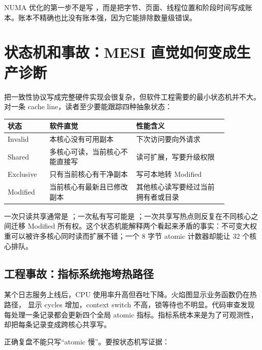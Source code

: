 \begin{keyidea}
NUMA 优化的第一步不是写 ，而是把字节、页面、线程位置和阶段时间写成账本。账本不精确也比没有账本强，因为它能排除数量级错误。
\end{keyidea}

\section{状态机和事故：MESI 直觉如何变成生产诊断}

把一致性协议写成完整硬件实现会很复杂，但软件工程需要的最小状态机并不大。对一条 cache line，读者至少要能跟踪四种抽象状态：

\begin{center}
\begin{tabular}{p{0.16\linewidth}p{0.34\linewidth}p{0.36\linewidth}}
\toprule
状态 & 软件直觉 & 性能含义 \\
\midrule
Invalid & 本核心没有可用副本 & 下次访问要向外请求 \\
Shared & 多核心可读，当前核心不能直接写 & 读可扩展，写要升级权限 \\
Exclusive & 只有当前核心有干净副本 & 写可本地转 Modified \\
Modified & 当前核心有最新且已修改副本 & 其他核心读写要经过当前拥有者或目录 \\
\bottomrule
\end{tabular}
\end{center}

一次只读共享通常是 ；一次私有写可能是 ；一次共享写热点则反复在不同核心之间迁移 Modified 所有权。这个状态机能解释两个看起来矛盾的事实：不可变大权重可以被许多核心同时读而扩展不错；一个 8 字节 atomic 计数器却能让 32 个核心排队。

\subsection{工程事故：指标系统拖垮热路径}

某个日志服务上线后，CPU 使用率升高但吞吐下降。火焰图显示业务函数仍在热路径， 显示 cycles 增加，context switch 不高，锁等待也不明显。代码审查发现每处理一条记录都会更新四个全局 atomic 指标。指标系统本来是为了可观测性，却把每条记录变成跨核心共享写。

正确复盘不能只写“atomic 慢”。要按状态机写证据：

